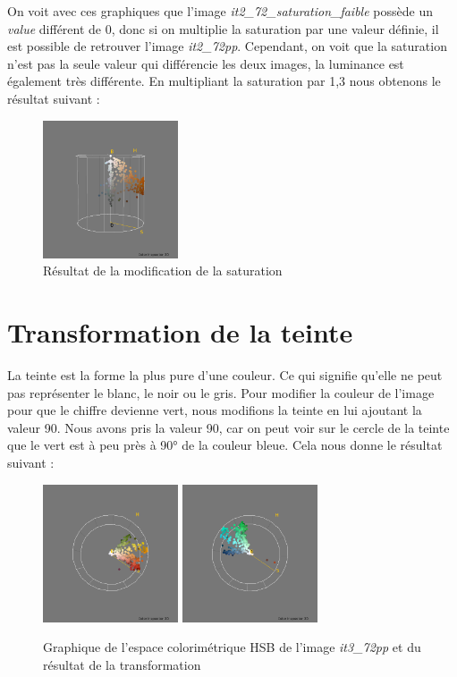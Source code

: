 \documentclass[a4paper,10pt]{article}
\begin{document}
On voit avec ces graphiques que l'image \textit{it2\_72\_saturation\_faible} possède un \textit{value} différent de 0, donc si on 
multiplie la saturation par une valeur définie, il est possible de retrouver l'image \textit{it2\_72pp}. Cependant, on voit que 
la saturation n'est pas la seule valeur qui différencie les deux images, la luminance est également très différente. En multipliant
la saturation par 1,3 nous obtenons le résultat suivant :

\begin{figure}[!h]
 \begin{center}
 \includegraphics[width=4cm]{resultat/resultat_saturation.png}
 \caption{Résultat de la modification de la saturation}
 \end{center}
\end{figure}

\section{Transformation de la teinte}
La teinte est la forme la plus pure d'une couleur. Ce qui signifie qu'elle ne peut pas représenter le blanc, le noir ou le gris.
Pour modifier la couleur de l'image pour que le chiffre devienne vert, nous modifions la teinte en lui ajoutant la valeur 90.
Nous avons pris la valeur 90, car on peut voir sur le cercle de la teinte que le vert est à peu près à 90° de la couleur bleue.
Cela nous donne le résultat suivant : 
\begin{figure}[!h]
 \begin{center}
 \includegraphics[width=4cm]{resultat/teinte1.png}
 \includegraphics[width=4cm]{resultat/teinte2.png}
 \caption{Graphique de l'espace colorimétrique HSB de l'image \textit{it3\_72pp} et du résultat de la transformation}
 \end{center}
\end{figure}
\end{document}
